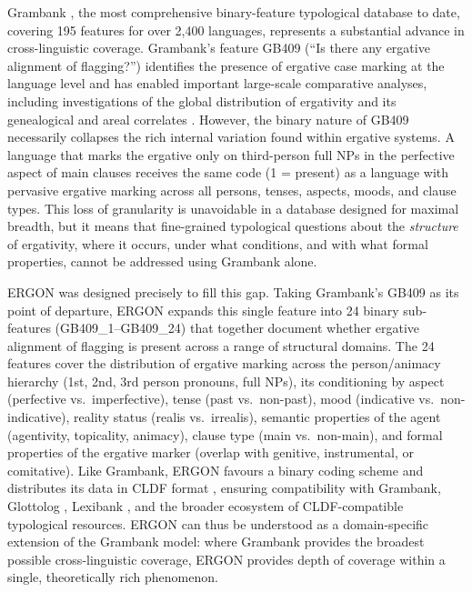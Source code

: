 \documentclass[12pt,a4paper]{article}
\begin{document}
Grambank \cite{grambank2023}, the most comprehensive binary-feature typological database to date, covering 195 features for over 2,400 languages, represents a substantial advance in cross-linguistic coverage. Grambank's feature GB409 (``Is there any ergative alignment of flagging?'') identifies the presence of ergative case marking at the language level and has enabled important large-scale comparative analyses, including investigations of the global distribution of ergativity and its genealogical and areal correlates \cite{grambank2023}. However, the binary nature of GB409 necessarily collapses the rich internal variation found within ergative systems. A language that marks the ergative only on third-person full NPs in the perfective aspect of main clauses receives the same code (1 = present) as a language with pervasive ergative marking across all persons, tenses, aspects, moods, and clause types. This loss of granularity is unavoidable in a database designed for maximal breadth, but it means that fine-grained typological questions about the \textit{structure} of ergativity, where it occurs, under what conditions, and with what formal properties, cannot be addressed using Grambank alone.

ERGON was designed precisely to fill this gap. Taking Grambank's GB409 as its point of departure, ERGON expands this single feature into 24 binary sub-features (GB409\_1--GB409\_24) that together document whether ergative alignment of flagging is present across a range of structural domains. The 24 features cover the distribution of ergative marking across the person/animacy hierarchy (1st, 2nd, 3rd person pronouns, full NPs), its conditioning by aspect (perfective vs.\ imperfective), tense (past vs.\ non-past), mood (indicative vs.\ non-indicative), reality status (realis vs.\ irrealis), semantic properties of the agent (agentivity, topicality, animacy), clause type (main vs.\ non-main), and formal properties of the ergative marker (overlap with genitive, instrumental, or comitative). Like Grambank, ERGON favours a binary coding scheme and distributes its data in CLDF format \cite{forkel2018}, ensuring compatibility with Grambank, Glottolog \cite{hammarstrom2024}, Lexibank \cite{list2022}, and the broader ecosystem of CLDF-compatible typological resources. ERGON can thus be understood as a domain-specific extension of the Grambank model: where Grambank provides the broadest possible cross-linguistic coverage, ERGON provides depth of coverage within a single, theoretically rich phenomenon.
\end{document}
